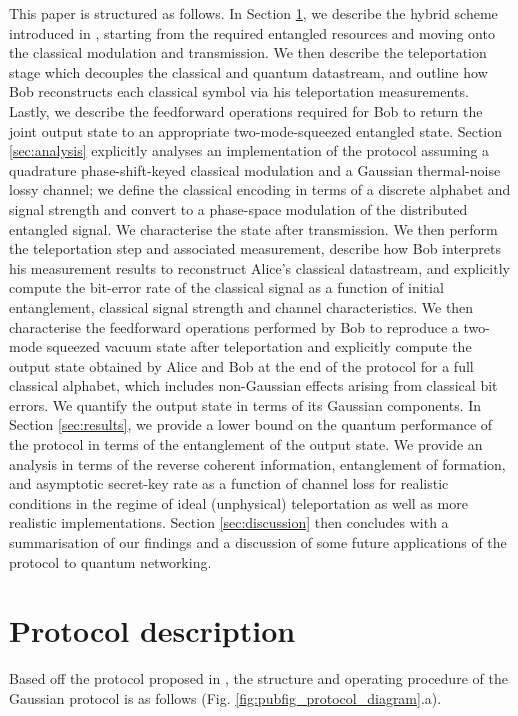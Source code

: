 \documentclass[%
 reprint,
 superscriptaddress,
 amsmath,
 amssymb,
 aps,
 pra,
]{revtex4-2}
\begin{document}
This paper is structured as follows. In Section \ref{sec:protocols}, we describe the hybrid scheme introduced in \cite{zaunders_generalised_2026}, starting from the required entangled resources and moving onto the classical modulation and transmission. We then describe the teleportation stage which decouples the classical and quantum datastream, and outline how Bob reconstructs each classical symbol via his teleportation measurements. Lastly, we describe the feedforward operations required for Bob to return the joint output state to an appropriate two-mode-squeezed entangled state. Section \ref{sec:analysis} explicitly analyses an implementation of the protocol assuming a quadrature phase-shift-keyed classical modulation and a Gaussian thermal-noise lossy channel; we define the classical encoding in terms of a discrete alphabet and signal strength and convert to a phase-space modulation of the distributed entangled signal. We characterise the state after transmission. We then perform the teleportation step and associated measurement, describe how Bob interprets his measurement results to reconstruct Alice's classical datastream, and explicitly compute the bit-error rate of the classical signal as a function of initial entanglement, classical signal strength and channel characteristics. We then characterise the feedforward operations performed by Bob to reproduce a two-mode squeezed vacuum state after teleportation and explicitly compute the output state obtained by Alice and Bob at the end of the protocol for a full classical alphabet, which includes non-Gaussian effects arising from classical bit errors. We quantify the output state in terms of its Gaussian components. In Section \ref{sec:results}, we provide a lower bound on the quantum performance of the protocol in terms of the entanglement of the output state. We provide an analysis in terms of the reverse coherent information, entanglement of formation, and asymptotic secret-key rate as a function of channel loss for realistic conditions in the regime of ideal (unphysical) teleportation as well as more realistic implementations. Section \ref{sec:discussion} then concludes with a summarisation of our findings and a discussion of some future applications of the protocol to quantum networking.

\section{Protocol description} \label{sec:protocols}
Based off the protocol proposed in \cite{zaunders_generalised_2026}, the structure and operating procedure of the Gaussian protocol is as follows (Fig. \ref{fig:pubfig_protocol_diagram}.a).
\end{document}
